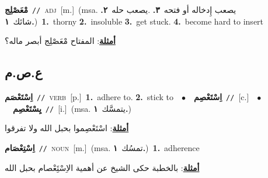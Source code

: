 \documentclass[10pt,a4paper,twoside]{article} %
\begin{document}
\begin{multicols}{2}
{\setlength\topsep{0pt}\textbf{\foreignlanguage{arabic}{مْعَصْلِج}}\ {\color{gray}\texttt{//}\color{black}}\ \textsc{adj}\ [m.]\ \color{gray}(msa. \foreignlanguage{arabic}{يصعب إِدخاله أو فتحه}~\foreignlanguage{arabic}{\textbf{٣.}}  .\foreignlanguage{arabic}{يصعب حله}~\foreignlanguage{arabic}{\textbf{٢.}}  \foreignlanguage{arabic}{شائك}~\foreignlanguage{arabic}{\textbf{١.}})\color{black}\ \textbf{1.}~thorny  \textbf{2.}~insoluble  \textbf{3.}~get stuck.  \textbf{4.}~become hard to insert\  \begin{flushright}\color{gray}\foreignlanguage{arabic}{\textbf{\underline{\foreignlanguage{arabic}{أمثلة}}}: المفتاح مْعَصْلِج أبصر ماله؟}\end{flushright}\color{black}} \vspace{2mm}

\vspace{-3mm}
\subsection*{\color{blue}\foreignlanguage{arabic}{ع.ص.م}\color{blue}{}} 

{\setlength\topsep{0pt}\textbf{\foreignlanguage{arabic}{اِسْتَعْصَم}}\ {\color{gray}\texttt{//}\color{black}}\ \textsc{verb}\ [p.]\ \textbf{1.}~adhere to.  \textbf{2.}~stick to\ \ $\bullet$\ \ \setlength\topsep{0pt}\textbf{\foreignlanguage{arabic}{اِسْتَعْصِم}}\ {\color{gray}\texttt{//}\color{black}}\ [c.]\ \ $\bullet$\ \ \setlength\topsep{0pt}\textbf{\foreignlanguage{arabic}{يِسْتَعْصِم}}\ {\color{gray}\texttt{//}\color{black}}\ [i.]\ \color{gray}(msa. \foreignlanguage{arabic}{يتمسَّك}~\foreignlanguage{arabic}{\textbf{١.}})\color{black}\  \begin{flushright}\color{gray}\foreignlanguage{arabic}{\textbf{\underline{\foreignlanguage{arabic}{أمثلة}}}: اسْتَعْصِموا بحبل الله ولا تفرقوا}\end{flushright}\color{black}} \vspace{2mm}

{\setlength\topsep{0pt}\textbf{\foreignlanguage{arabic}{اِسْتِعْصَام}}\ {\color{gray}\texttt{//}\color{black}}\ \textsc{noun}\ [m.]\ \color{gray}(msa. \foreignlanguage{arabic}{تمسُك}~\foreignlanguage{arabic}{\textbf{١.}})\color{black}\ \textbf{1.}~adherence\  \begin{flushright}\color{gray}\foreignlanguage{arabic}{\textbf{\underline{\foreignlanguage{arabic}{أمثلة}}}: بالخطبة حكى الشيخ عن أهمية الاِسْتَِعْصام بحبل الله}\end{flushright}\color{black}} \vspace{2mm}


\end{multicols}
\end{document}
